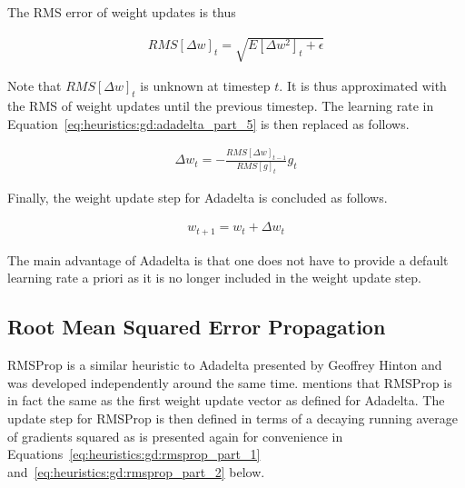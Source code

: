 The \ac{RMS} error of weight updates is thus

\begin{equation}
      \label{eq:heuristics:gd:adadelta_part_7}
      \begin{split}
            RMS[\Delta w]_{t} = \sqrt{E[\Delta w^{2}]_{t} + \epsilon}
      \end{split}
\end{equation}

Note that $RMS[\Delta w]_{t}$ is unknown at timestep $t$. It is thus approximated with the \ac{RMS} of weight updates until the previous timestep. The learning rate in Equation~\ref{eq:heuristics:gd:adadelta_part_5} is then replaced as follows.

\begin{equation}
      \label{eq:heuristics:gd:adadelta_part_8}
      \begin{split}
            \Delta w_{t} = - \frac{RMS[\Delta w]_{t-1}}{RMS[g]_{t}} g_{t}
      \end{split}
\end{equation}

Finally, the weight update step for \ac{Adadelta} is concluded as follows.

\begin{equation}
      \label{eq:heuristics:gd:adadelta_part_9}
      \begin{split}
            w_{t+1} = w_{t} + \Delta w_{t}
      \end{split}
\end{equation}

The main advantage of \ac{Adadelta} is that one does not have to provide a default learning rate a priori as it is no longer included in the weight update step.

\subsection{Root Mean Squared Error Propagation}
\label{sec:heuristics:rmsprop}

\Ac{RMSProp} is a similar heuristic to \ac{Adadelta} presented by Geoffrey Hinton \cite{ref:hinton:2012} and was developed independently around the same time. \citeauthor{ref:ruder:2016}\cite{ref:ruder:2016} mentions that \ac{RMSProp} is in fact the same as the first weight update vector as defined for \ac{Adadelta}. The update step for \ac{RMSProp} is then defined in terms of a decaying running average of gradients squared as is presented again for convenience in Equations~\ref{eq:heuristics:gd:rmsprop_part_1} and~\ref{eq:heuristics:gd:rmsprop_part_2} below.


